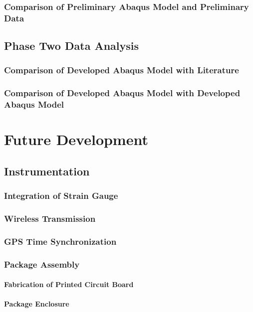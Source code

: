 \documentclass[12pt]{report}
\begin{document}
		\subsection{Comparison of Preliminary Abaqus Model and Preliminary Data}
			
	\section{Phase Two Data Analysis}
		\subsection{Comparison of Developed Abaqus Model with Literature}
			
		\subsection{Comparison of Developed Abaqus Model with Developed Abaqus Model}	
		
\chapter{Future Development}
\label{ch:FutureDevelopment}
	\section{Instrumentation}
		\subsection{Integration of Strain Gauge}
			
		\subsection{Wireless Transmission}
			\label{sec:XBeeFuture}
			
		\subsection{GPS Time Synchronization}
			
		\subsection{Package Assembly}
			\subsubsection{Fabrication of Printed Circuit Board}
				
			\subsubsection{Package Enclosure}
				
\end{document}
